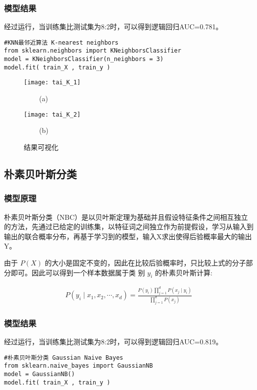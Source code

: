 \documentclass[withoutpreface,bwprint]{cumcmthesis} %
\begin{document}
\subsubsection{模型结果}
\par 经过运行，当训练集比测试集为8:2时，可以得到逻辑回归AUC=0.781。
\begin{lstlisting}
#KNN最邻近算法 K-nearest neighbors
from sklearn.neighbors import KNeighborsClassifier
model = KNeighborsClassifier(n_neighbors = 3)
model.fit( train_X , train_y )
\end{lstlisting}

\begin{figure}[H]
	\centering
	\begin{minipage}[t]{0.48\textwidth}
		\centering
		\texttt{[image: tai\_K\_1]}
		\centerline{$\ \ \ \ \ \ \ \ \ \ $(a)}
	\end{minipage}
	\begin{minipage}[t]{0.48\textwidth}
		\centering
		\texttt{[image: tai\_K\_2]}
		\centerline{$\ \ \ \ \ \ \ \ \ \ $(b)}
	\end{minipage}
	
	\caption{结果可视化}
\end{figure}





\subsection{朴素贝叶斯分类}
\subsubsection{模型原理}
\par 朴素贝叶斯分类（NBC）是以贝叶斯定理为基础并且假设特征条件之间相互独立的方法，先通过已给定的训练集，以特征词之间独立作为前提假设，学习从输入到输出的联合概率分布，再基于学习到的模型，输入X求出使得后验概率最大的输出Y。

由于  $P(X)$  的大小是固定不变的，因此在比较后验概率时，只比较上式的分子部分即可。因此可以得到一个样本数据属于类 别 $ y_{i} $ 的朴素贝叶斯计算:


\begin{align}
P\left(y_{i} \mid x_{1}, x_{2}, \cdots, x_{d}\right)=\frac{P\left(y_{i}\right) \prod_{j=1}^{d} P\left(x_{j} \mid y_{i}\right)}{\prod_{j=1}^{d} P\left(x_{j}\right)}
\end{align}
\subsubsection{模型结果}
\par 经过运行，当训练集比测试集为8:2时，可以得到逻辑回归AUC=0.819。
\begin{lstlisting}
#朴素贝叶斯分类 Gaussian Naive Bayes
from sklearn.naive_bayes import GaussianNB
model = GaussianNB()
model.fit( train_X , train_y )
\end{lstlisting}
\end{document}
